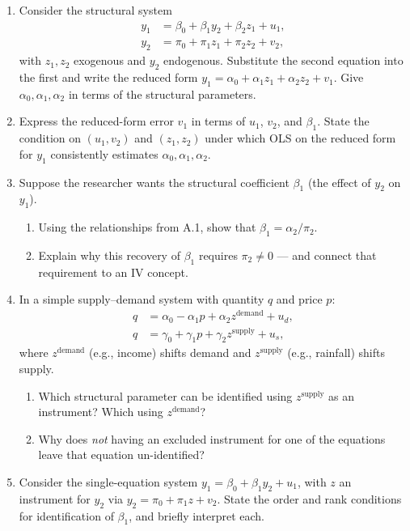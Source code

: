 \documentclass{article}
\begin{document}
\begin{enumerate}[label=\textbf{A.\arabic*},leftmargin=*,itemsep=10pt]

\item  Consider the structural system
\begin{align*}
  y_1 &= \beta_0 + \beta_1 y_2 + \beta_2 z_1 + u_1, \\
  y_2 &= \pi_0 + \pi_1 z_1 + \pi_2 z_2 + v_2,
\end{align*}
with $z_1, z_2$ exogenous and $y_2$ endogenous.  Substitute the second equation into the first and write the reduced form $y_1 = \alpha_0 + \alpha_1 z_1 + \alpha_2 z_2 + v_1$.  Give $\alpha_0, \alpha_1, \alpha_2$ in terms of the structural parameters.

\item  Express the reduced-form error $v_1$ in terms of $u_1$, $v_2$, and $\beta_1$.  State the condition on $(u_1, v_2)$ and $(z_1, z_2)$ under which OLS on the reduced form for $y_1$ consistently estimates $\alpha_0, \alpha_1, \alpha_2$.

\item  Suppose the researcher wants the structural coefficient $\beta_1$ (the effect of $y_2$ on $y_1$).
\begin{enumerate}[label=(\alph*)]
  \item Using the relationships from A.1, show that $\beta_1 = \alpha_2/\pi_2$.
  \item Explain why this recovery of $\beta_1$ requires $\pi_2 \neq 0$ --- and connect that requirement to an IV concept.
\end{enumerate}

\item  In a simple supply--demand system with quantity $q$ and price $p$:
\begin{align*}
  q &= \alpha_0 - \alpha_1 p + \alpha_2 z^{\text{demand}} + u_d, \\
  q &= \gamma_0 + \gamma_1 p + \gamma_2 z^{\text{supply}} + u_s,
\end{align*}
where $z^{\text{demand}}$ (e.g., income) shifts demand and $z^{\text{supply}}$ (e.g., rainfall) shifts supply.
\begin{enumerate}[label=(\alph*)]
  \item Which structural parameter can be identified using $z^{\text{supply}}$ as an instrument?  Which using $z^{\text{demand}}$?
  \item Why does \emph{not} having an excluded instrument for one of the equations leave that equation un-identified?
\end{enumerate}

\item  Consider the single-equation system $y_1 = \beta_0 + \beta_1 y_2 + u_1$, with $z$ an instrument for $y_2$ via $y_2 = \pi_0 + \pi_1 z + v_2$.  State the order and rank conditions for identification of $\beta_1$, and briefly interpret each.

\end{enumerate}
\end{document}
